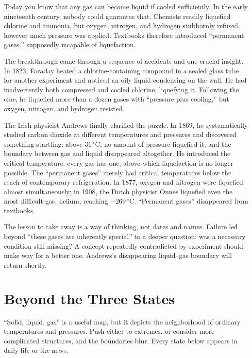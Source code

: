 \begin{zhengju}
Today you know that any gas can become liquid if cooled sufficiently. In the early nineteenth century, nobody could guarantee that. Chemists readily liquefied chlorine and ammonia, but oxygen, nitrogen, and hydrogen stubbornly refused, however much pressure was applied. Textbooks therefore introduced ``permanent gases,'' supposedly incapable of liquefaction.

The breakthrough came through a sequence of accidents and one crucial insight. In 1823, Faraday heated a chlorine-containing compound in a sealed glass tube for another experiment and noticed an oily liquid condensing on the wall. He had inadvertently both compressed and cooled chlorine, liquefying it. Following the clue, he liquefied more than a dozen gases with ``pressure plus cooling,'' but oxygen, nitrogen, and hydrogen resisted.

The Irish physicist Andrews finally clarified the puzzle. In 1869, he systematically studied carbon dioxide at different temperatures and pressures and discovered something startling: above $31\,^{\circ}\mathrm{C}$, no amount of pressure liquefied it, and the boundary between gas and liquid disappeared altogether. He introduced the critical temperature: every gas has one, above which liquefaction is no longer possible. The ``permanent gases'' merely had critical temperatures below the reach of contemporary refrigeration. In 1877, oxygen and nitrogen were liquefied almost simultaneously; in 1908, the Dutch physicist Onnes liquefied even the most difficult gas, helium, reaching $-269\,^{\circ}\mathrm{C}$. ``Permanent gases'' disappeared from textbooks.

The lesson to take away is a way of thinking, not dates and names. Failure led beyond ``these gases are inherently special'' to a deeper question: was a necessary condition still missing? A concept repeatedly contradicted by experiment should make way for a better one. Andrews's disappearing liquid--gas boundary will return shortly.
\end{zhengju}

\section{Beyond the Three States}

``Solid, liquid, gas'' is a useful map, but it depicts the neighborhood of ordinary temperatures and pressures. Push either to extremes, or consider more complicated structures, and the boundaries blur. Every state below appears in daily life or the news.

